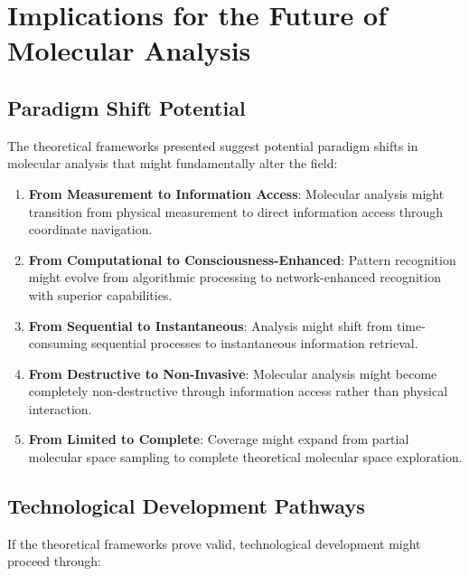 \documentclass[11pt,a4paper]{article}
\theoremstyle{remark}
\begin{document}
\section{Implications for the Future of Molecular Analysis}

\subsection{Paradigm Shift Potential}

The theoretical frameworks presented suggest potential paradigm shifts in molecular analysis that might fundamentally alter the field:

\begin{enumerate}
\item \textbf{From Measurement to Information Access}: Molecular analysis might transition from physical measurement to direct information access through coordinate navigation.

\item \textbf{From Computational to Consciousness-Enhanced}: Pattern recognition might evolve from algorithmic processing to network-enhanced recognition with superior capabilities.

\item \textbf{From Sequential to Instantaneous}: Analysis might shift from time-consuming sequential processes to instantaneous information retrieval.

\item \textbf{From Destructive to Non-Invasive}: Molecular analysis might become completely non-destructive through information access rather than physical interaction.

\item \textbf{From Limited to Complete}: Coverage might expand from partial molecular space sampling to complete theoretical molecular space exploration.
\end{enumerate}

\subsection{Technological Development Pathways}

If the theoretical frameworks prove valid, technological development might proceed through:
\end{document}
